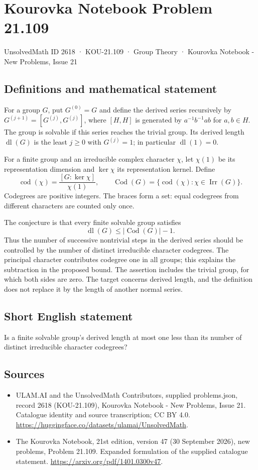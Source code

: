 \documentclass[11pt,a4paper]{article}
\begin{document}
\section*{Kourovka Notebook Problem 21.109}\label{2618}
{\small UnsolvedMath ID 2618 · KOU-21.109 · Group Theory · Kourovka Notebook - New Problems, Issue 21}
\subsection{Definitions and mathematical statement}
For a group $G$, put $G^{(0)}=G$ and define the derived series recursively by $G^{(j+1)}=[G^{(j)},G^{(j)}]$, where $[H,H]$ is generated by $a^{-1}b^{-1}ab$ for $a,b\in H$. The group is solvable if this series reaches the trivial group. Its derived length $\operatorname{dl}(G)$ is the least $j\ge0$ with $G^{(j)}=1$; in particular $\operatorname{dl}(1)=0$.

For a finite group and an irreducible complex character $\chi$, let $\chi(1)$ be its representation dimension and $\ker\chi$ its representation kernel. Define
\[
 \operatorname{cod}(\chi)=\frac{[G:\ker\chi]}{\chi(1)},\qquad
 \operatorname{Cod}(G)=\{\operatorname{cod}(\chi):\chi\in\operatorname{Irr}(G)\}.
\]
Codegrees are positive integers. The braces form a set: equal codegrees from different characters are counted only once.

The conjecture is that every finite solvable group satisfies
\[
 \operatorname{dl}(G)\le|\operatorname{Cod}(G)|-1.
\]
Thus the number of successive nontrivial steps in the derived series should be controlled by the number of distinct irreducible character codegrees. The principal character contributes codegree one in all groups; this explains the subtraction in the proposed bound. The assertion includes the trivial group, for which both sides are zero. The target concerns derived length, and the definition does not replace it by the length of another normal series.
\subsection{Short English statement}
Is a finite solvable group’s derived length at most one less than its number of distinct irreducible character codegrees?
\subsection{Sources}
\begin{itemize}
\item[S1] ULAM.AI and the UnsolvedMath Contributors, supplied problems.json, record 2618 (KOU-21.109), Kourovka Notebook - New Problems, Issue 21. Catalogue identity and source transcription; CC BY 4.0.
\url{https://huggingface.co/datasets/ulamai/UnsolvedMath}.
\item[S2] The Kourovka Notebook, 21st edition, version 47 (30 September 2026), new problems, Problem 21.109. Expanded formulation of the supplied catalogue statement.
\url{https://arxiv.org/pdf/1401.0300v47}.
\end{itemize}
\end{document}
